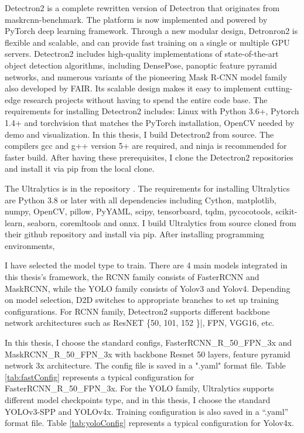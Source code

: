 Detectron2 is a complete rewritten version of Detectron that originates from maskrcnn-benchmark. The platform is now implemented and powered by PyTorch deep learning framework. Through a new modular design, Detronron2 is flexible and scalable, and can provide fast training on a single or multiple GPU servers. Detectron2 includes high-quality implementations of state-of-the-art object detection algorithms, including DensePose, panoptic feature pyramid networks, and numerous variants of the pioneering Mask R-CNN model family also developed by FAIR. Its scalable design makes it easy to implement cutting-edge research projects without having to spend the entire code base. The requirements for installing Detectron2 includes: Linux with Python 3.6+, Pytorch 1.4+ and torchvision that matches the PyTorch installation, OpenCV needed by demo and visualization. In this thesis, I build Detectron2 from source. The compilers gcc and g++ version 5+ are required, and ninja is recommended for faster build. After having these prerequisites, I clone the Detectron2 repositories and install it via pip from the local clone.

The Ultralytics  is in the repository \cite{ultralytics}. The requirements for installing Ultralytics are Python 3.8 or later with all dependencies including Cython, matplotlib, numpy, OpenCV, pillow, PyYAML, scipy, tensorboard, tqdm, pycocotools, scikit-learn, seaborn, coremltools and onnx. I build Ultralytics from source cloned from their github repository and install via pip.
After installing programming environments,

I have selected the model type to train. There are 4 main models integrated in this thesis's framework, the RCNN family consists of FasterRCNN and MaskRCNN, while the YOLO family consists of Yolov3 and Yolov4. Depending on model selection, D2D switches to appropriate branches to set up training configurations. For RCNN family, Detectron2 supports different backbone network architectures such as ResNET \{50, 101, 152 \}|, FPN, VGG16, etc.

In this thesis, I choose the standard configs, FasterRCNN\_R\_50\_FPN\_3x and MaskRCNN\_R\_50\_FPN\_3x with backbone Resnet 50 layers, feature pyramid network 3x architecture. The config file is saved in a ".yaml" format file. Table \ref{tab:fastConfig} represents a typical configuration for FasterRCNN\_R\_50\_FPN\_3x.
For the YOLO family, Ultralytics supports different model checkpoints type, and in this thesis, I choose the standard YOLOv3-SPP and YOLOv4x. Training configuration is also saved in a “.yaml” format file. Table \ref{tab:yoloConfig} represents a typical configuration for Yolov4x.

